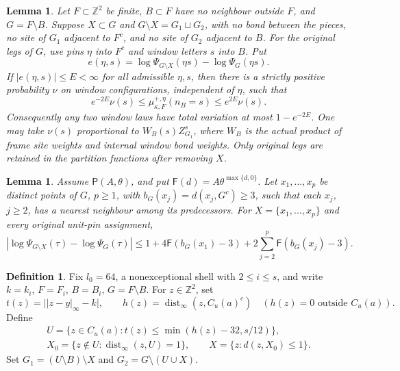 \documentclass[11pt,reqno]{amsart}
\newtheorem{lemma}[theorem]{Lemma}
\theoremstyle{definition}
\newtheorem{definition}[theorem]{Definition}
\theoremstyle{remark}
\begin{document}
\begin{lemma}\label{l:cut}
Let \(F\subset\mathbb Z^2\) be finite, \(B\subset F\) have no
neighbour outside \(F\), and \(G=F\setminus B\).
Suppose \(X\subset G\) and \(G\setminus X=G_1\sqcup G_2\), with
no bond between the pieces, no site of \(G_1\) adjacent to \(F^c\),
and no site of \(G_2\) adjacent to \(B\).
For the original legs of \(G\), use pins \(\eta\) into \(F^c\)
and window letters \(s\) into \(B\). Put
\[
 e(\eta,s)=\log\Psi_{G\setminus X}(\eta s)-\log\Psi_G(\eta s).
\]
If \(|e(\eta,s)|\le E<\infty\) for all admissible \(\eta,s\),
then there is a strictly positive probability \(\nu\) on window
configurations, independent of \(\eta\), such that
\[
 e^{-2E}\nu(s)\le\mu^{+,\eta}_{\kappa,F}(n_B=s)
                         \le e^{2E}\nu(s).
\]
Consequently any two window laws have total variation at most
\(1-e^{-2E}\).
One may take \(\nu(s)\) proportional to \(W_B(s)Z_{G_1}^{s}\),
where \(W_B\) is the actual product of frame site weights and
internal window bond weights. Only original legs are retained in
the partition functions after removing \(X\).
\end{lemma}

\begin{lemma}\label{l:removal}
Assume \(\mathsf P(A,\theta)\), and put
\(\mathsf F(d)=A\theta^{\max\{d,0\}}\).
Let \(x_1,\ldots,x_p\) be distinct points of \(G\), \(p\ge1\),
with \(b_G(x_j)=d(x_j,G^c)\ge3\), such that each \(x_j\), \(j\ge2\),
has a nearest neighbour among its predecessors.
For \(X=\{x_1,\ldots,x_p\}\) and every original unit-pin assignment,
\[
 |\log\Psi_{G\setminus X}(\tau)-\log\Psi_G(\tau)|
 \le1+4\mathsf F(b_G(x_1)-3)
                  +2\sum_{j=2}^p\mathsf F(b_G(x_j)-3).
\]
\end{lemma}

\begin{definition}\label{d:thickcut}
Fix \(l_0=64\), a nonexceptional shell with \(2\le i\le s\),
and write \(k=k_i\), \(F=F_i\), \(B=B_i\), \(G=F\setminus B\).
For \(z\in\mathbb Z^2\), set
\[
 t(z)=\big||z-y|_\infty-k\big|,\qquad
 h(z)=\operatorname{dist}_\infty(z,C_u(a)^c)\quad
        (h(z)=0\text{ outside }C_u(a)).
\]
Define
\[
 \begin{gathered}
 U=\{z\in C_u(a):t(z)\le\min(h(z)-32,s/12)\},\\
 X_0=\{z\notin U:\operatorname{dist}_\infty(z,U)=1\},\qquad
 X=\{z:d(z,X_0)\le1\}.
 \end{gathered}
\]
Set \(G_1=(U\setminus B)\setminus X\) and
\(G_2=G\setminus(U\cup X)\).
\end{definition}
\end{document}
